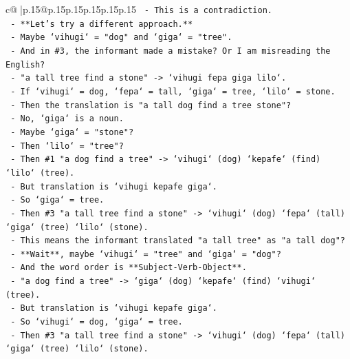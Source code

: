 \documentclass{article}
\begin{document}
{\begin{supertabular}{c@{$\;$}|p{.15\linewidth}@{}p{.15\linewidth}p{.15\linewidth}p{.15\linewidth}p{.15\linewidth}p{.15\linewidth}}
{{{\texttt{                {-}   This is a contradiction.} \\
\texttt{                {-}   **Let's try a different approach.**} \\
\texttt{                {-}   Maybe `vihugi` = "dog" and `giga` = "tree".} \\
\texttt{                {-}   And in \#3, the informant made a mistake? Or I am misreading the English?} \\
\texttt{                {-}   "a tall tree find a stone" {-}> `vihugi fepa giga lilo`.} \\
\texttt{                {-}   If `vihugi` = dog, `fepa` = tall, `giga` = tree, `lilo` = stone.} \\
\texttt{                {-}   Then the translation is "a tall dog find a tree stone"?} \\
\texttt{                {-}   No, `giga` is a noun.} \\
\texttt{                {-}   Maybe `giga` = "stone"?} \\
\texttt{                {-}   Then `lilo` = "tree"?} \\
\texttt{                {-}   Then \#1 "a dog find a tree" {-}> `vihugi` (dog) `kepafe` (find) `lilo` (tree).} \\
\texttt{                {-}   But translation is `vihugi kepafe giga`.} \\
\texttt{                {-}   So `giga` = tree.} \\
\texttt{                {-}   Then \#3 "a tall tree find a stone" {-}> `vihugi` (dog) `fepa` (tall) `giga` (tree) `lilo` (stone).} \\
\texttt{                {-}   This means the informant translated "a tall tree" as "a tall dog"?} \\
\texttt{                {-}   **Wait**, maybe `vihugi` = "tree" and `giga` = "dog"?} \\
\texttt{                {-}   And the word order is **Subject{-}Verb{-}Object**.} \\
\texttt{                {-}   "a dog find a tree" {-}> `giga` (dog) `kepafe` (find) `vihugi` (tree).} \\
\texttt{                {-}   But translation is `vihugi kepafe giga`.} \\
\texttt{                {-}   So `vihugi` = dog, `giga` = tree.} \\
\texttt{                {-}   Then \#3 "a tall tree find a stone" {-}> `vihugi` (dog) `fepa` (tall) `giga` (tree) `lilo` (stone).} \\
}}}
\end{supertabular}}
\end{document}
